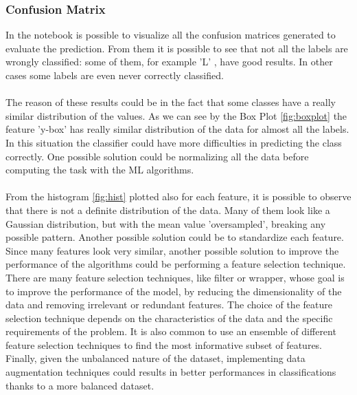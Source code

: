 \documentclass{article}
\begin{document}
\subsubsection*{Confusion Matrix}
In the notebook is possible to visualize all the confusion matrices generated to evaluate the prediction. From them it is possible to see that not all the labels are wrongly classified: some of them, for example 'L' , have good results. In other cases some labels are even never correctly classified.\\\\
The reason of these results could be in the fact that some classes have a really similar distribution of the values. As we can see by the Box Plot \ref{fig:boxplot} the feature 'y-box' has really similar distribution of the data for almost all the labels. In this situation the classifier could have more difficulties in predicting the class correctly. One possible solution could be normalizing all the data before computing the task with the ML algorithms.\\\\
From the histogram \ref{fig:hist} plotted also for each feature, it is possible to observe that there is not a definite distribution of the data. Many of them look like a Gaussian distribution, but with the mean value 'oversampled', breaking any possible pattern. Another possible solution could be to standardize each feature. Since many features look very similar, another possible solution to improve the performance of the algorithms could be performing a feature selection technique. There are many feature selection techniques, like filter or wrapper,  whose goal is to improve the performance of the model, by reducing the dimensionality of the data and removing irrelevant or redundant features. The choice of the feature selection technique depends on the characteristics of the data and the specific requirements of the problem. It is also common to use an ensemble of different feature selection techniques to find the most informative subset of features.\\
Finally, given the unbalanced nature of the dataset, implementing data augmentation techniques could results in better performances in classifications thanks to a more balanced dataset. 
\end{document}
